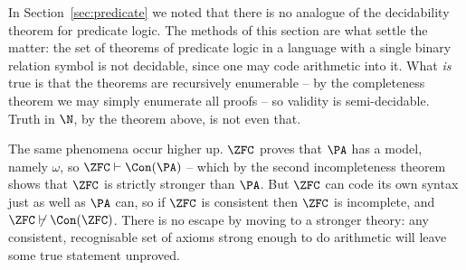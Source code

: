\begin{remark}
  In Section~\ref{sec:predicate} we noted that there is no analogue of the decidability theorem for predicate logic. The methods of this section are what settle the matter: the set of theorems of predicate logic in a language with a single binary relation symbol is not decidable, since one may code arithmetic into it. What \emph{is} true is that the theorems are recursively enumerable -- by the completeness theorem we may simply enumerate all proofs -- so validity is semi-decidable. Truth in $\N$, by the theorem above, is not even that.
\end{remark}

The same phenomena occur higher up. $\ZFC$ proves that $\PA$ has a model, namely $\omega$, so $\ZFC \vdash \Con(\PA)$ -- which by the second incompleteness theorem shows that $\ZFC$ is strictly stronger than $\PA$. But $\ZFC$ can code its own syntax just as well as $\PA$ can, so if $\ZFC$ is consistent then $\ZFC$ is incomplete, and $\ZFC \not\vdash \Con(\ZFC)$. There is no escape by moving to a stronger theory: any consistent, recognisable set of axioms strong enough to do arithmetic will leave some true statement unproved.

